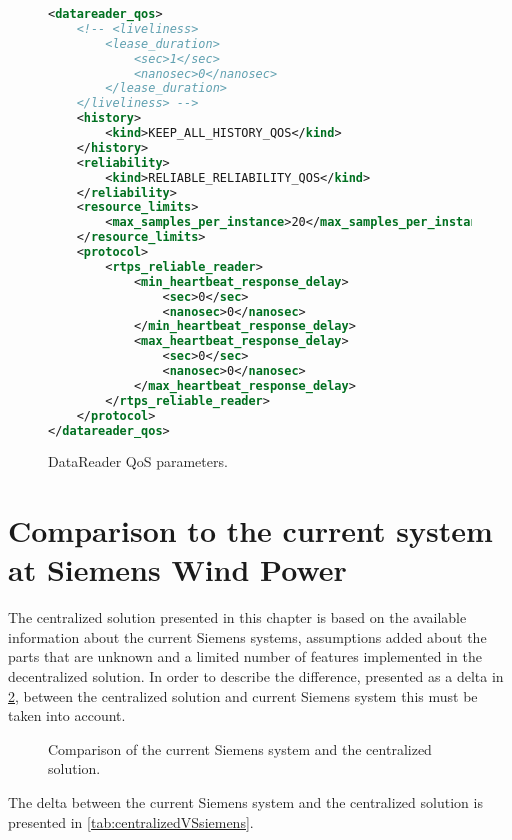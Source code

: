 \begin{figure}[!h]
\begin{lstlisting}[language=XML]
<datareader_qos>
	<!-- <liveliness>
		<lease_duration>
			<sec>1</sec>
			<nanosec>0</nanosec>
		</lease_duration>
	</liveliness> -->
	<history>
		<kind>KEEP_ALL_HISTORY_QOS</kind>
	</history>
	<reliability>
		<kind>RELIABLE_RELIABILITY_QOS</kind>
	</reliability>
	<resource_limits>
		<max_samples_per_instance>20</max_samples_per_instance>
	</resource_limits>
	<protocol>
		<rtps_reliable_reader>
			<min_heartbeat_response_delay>
				<sec>0</sec>
				<nanosec>0</nanosec>
			</min_heartbeat_response_delay>
			<max_heartbeat_response_delay>
				<sec>0</sec>
				<nanosec>0</nanosec>
			</max_heartbeat_response_delay>
		</rtps_reliable_reader>
	</protocol>
</datareader_qos>
\end{lstlisting}
\caption[DataReader QoS parameters]{
		\label{fig:readerQoS} 
		\footnotesize{DataReader QoS parameters.}
	}
\end{figure}

\FloatBarrier

\section{Comparison to the current system at Siemens Wind Power}
The centralized solution presented in this chapter is based on the available information about the current Siemens systems, assumptions added about the parts that are unknown and a limited number of features implemented in the decentralized solution. In order to describe the difference, presented as a delta in \cref{fig:projectDiffOverviewCentralizedSiemens}, between the centralized solution and current Siemens system this must be taken into account.

\begin{figure}
	\centering
	
	\caption[Comparison of the current Siemens system and the centralized solution]{
		\label{fig:projectDiffOverviewCentralizedSiemens}
		\footnotesize{%
			Comparison of the current Siemens system and the centralized solution.
		}
	}
\end{figure}

\FloatBarrier

The delta between the current Siemens system and the centralized solution is presented in \cref{tab:centralizedVSsiemens}.

